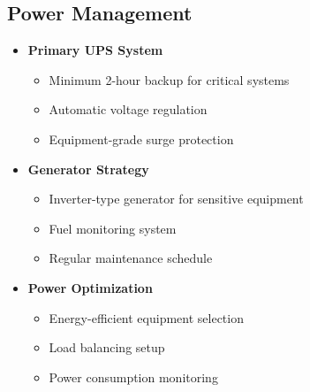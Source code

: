 \subsection{Power Management}\label{subsec:power-management}
\begin{tcolorbox}[colback=white,colframe=primarydark,title=\textbf{Power Setup Essentials}]
\begin{itemize}
    \item \textbf{Primary UPS System}
    \begin{itemize}
        \item Minimum 2-hour backup for critical systems
        \item Automatic voltage regulation
        \item Equipment-grade surge protection
    \end{itemize}

    \item \textbf{Generator Strategy}
    \begin{itemize}
        \item Inverter-type generator for sensitive equipment
        \item Fuel monitoring system
        \item Regular maintenance schedule
    \end{itemize}

    \item \textbf{Power Optimization}
    \begin{itemize}
        \item Energy-efficient equipment selection
        \item Load balancing setup
        \item Power consumption monitoring
    \end{itemize}
\end{itemize}
\end{tcolorbox}
